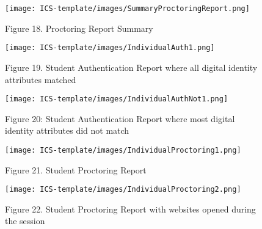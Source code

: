 \documentclass{icsthesis}
\begin{document}
\begin{mainmatter}
\begin{figure}[h]
    \centering
    \texttt{[image: ICS-template/images/SummaryProctoringReport.png]}
    \newline
    \captionsetup{labelformat=empty}
    \caption{Figure 18. Proctoring Report Summary}
    \label{Fig:image label}
\end{figure}

\begin{figure}[h]
    \centering
    \texttt{[image: ICS-template/images/IndividualAuth1.png]}
    \newline
    \captionsetup{labelformat=empty}
    \caption{Figure 19. Student Authentication Report where all digital identity attributes matched}
    \label{Figure 19: Student Authentication Report where all digital identity attributes matched}
\end{figure}

\begin{figure}[h]
    \centering
    \texttt{[image: ICS-template/images/IndividualAuthNot1.png]}
    \newline
    \captionsetup{labelformat=empty}
    \caption{Figure 20: Student Authentication Report where most digital identity attributes did not match}
    \label{Figure 20: Student Authentication Report where most digital identity attributes did not match}
\end{figure}

\begin{figure}[h]
    \centering
    \texttt{[image: ICS-template/images/IndividualProctoring1.png]}
    \newline
    \captionsetup{labelformat=empty}
    \caption{Figure 21. Student Proctoring Report}
    \label{Figure 21: Student Proctoring Report}
\end{figure}

\begin{figure}[h]
    \centering
    \texttt{[image: ICS-template/images/IndividualProctoring2.png]}
    \newline
    \captionsetup{labelformat=empty}
    \caption{Figure 22. Student Proctoring Report with websites opened during the session}
    \label{Figure 22: Student Proctoring Report with websites opened during the session}
\end{figure}

\end{mainmatter}
\end{document}
